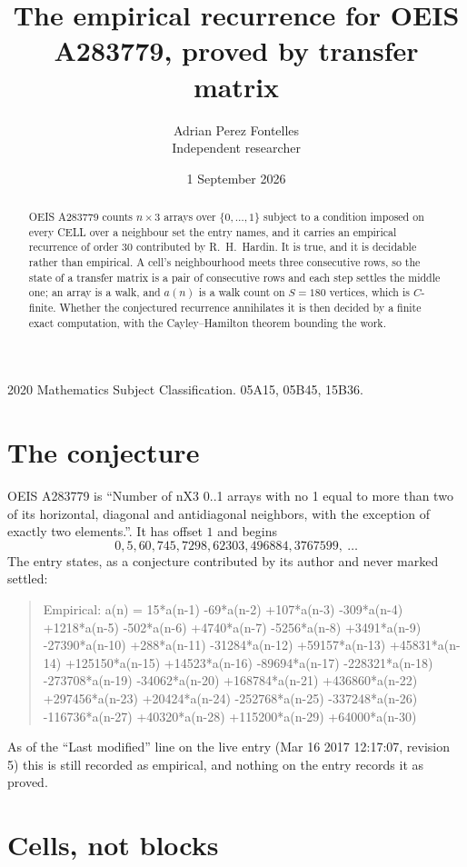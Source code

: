 \documentclass[11pt,a4paper]{article}
\title{The empirical recurrence for OEIS A283779, proved by transfer matrix}
\author{Adrian Perez Fontelles\\ \small Independent researcher}
\date{1 September 2026}
\theoremstyle{plain}
\theoremstyle{definition}
\begin{document}
\maketitle

\begin{abstract}
OEIS A283779 counts $n\times3$ arrays over $\{0,\dots,1\}$ subject to a condition imposed on
every CELL over a neighbour set the entry names, and it carries an empirical recurrence of
order $30$ contributed by R.~H.~Hardin. It is true, and it is decidable rather than
empirical. A cell's neighbourhood meets three consecutive rows, so the state of a transfer
matrix is a pair of consecutive rows and each step settles the middle one; an array is a
walk, and $a(n)$ is a walk count on $S=180$ vertices, which is $C$-finite. Whether the
conjectured recurrence annihilates it is then decided by a finite exact computation, with the
Cayley--Hamilton theorem bounding the work.
\end{abstract}

\noindent\small 2020 Mathematics Subject Classification. 05A15, 05B45, 15B36.\normalsize

\section{The conjecture}

OEIS A283779 is ``Number of nX3 0..1 arrays with no 1 equal to more than two of its horizontal, diagonal and antidiagonal neighbors, with the exception of exactly two elements.''. It has offset $1$ and begins
\[
0, 5, 60, 745, 7298, 62303, 496884, 3767599,\ \dots
\]
The entry states, as a conjecture contributed by its author and never marked settled:
\begin{quote}
Empirical: a(n) = 15*a(n-1) -69*a(n-2) +107*a(n-3) -309*a(n-4) +1218*a(n-5) -502*a(n-6) +4740*a(n-7) -5256*a(n-8) +3491*a(n-9) -27390*a(n-10) +288*a(n-11) -31284*a(n-12) +59157*a(n-13) +45831*a(n-14) +125150*a(n-15) +14523*a(n-16) -89694*a(n-17) -228321*a(n-18) -273708*a(n-19) -34062*a(n-20) +168784*a(n-21) +436860*a(n-22) +297456*a(n-23) +20424*a(n-24) -252768*a(n-25) -337248*a(n-26) -116736*a(n-27) +40320*a(n-28) +115200*a(n-29) +64000*a(n-30)
\end{quote}
As of the ``Last modified'' line on the live entry (Mar 16 2017 12:17:07, revision 5) this is still
recorded as empirical, and nothing on the entry records it as proved.

\section{Cells, not blocks}
\end{document}
